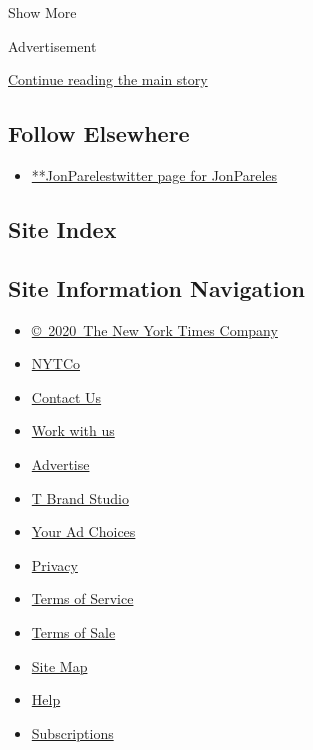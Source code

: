 Show More

Advertisement

\protect\hyperlink{after-mid2}{Continue reading the main story}

\hypertarget{follow-elsewhere}{%
\subsection{Follow Elsewhere}\label{follow-elsewhere}}

\begin{itemize}
\tightlist
\item
  \href{https://twitter.com/JonPareles}{**JonParelestwitter page for
  JonPareles}
\end{itemize}

\hypertarget{site-index}{%
\subsection{Site Index}\label{site-index}}

\hypertarget{site-information-navigation}{%
\subsection{Site Information
Navigation}\label{site-information-navigation}}

\begin{itemize}
\tightlist
\item
  \href{https://help.nytimes.com/hc/en-us/articles/115014792127-Copyright-notice}{©~2020~The
  New York Times Company}
\end{itemize}

\begin{itemize}
\tightlist
\item
  \href{https://www.nytco.com/}{NYTCo}
\item
  \href{https://help.nytimes.com/hc/en-us/articles/115015385887-Contact-Us}{Contact
  Us}
\item
  \href{https://www.nytco.com/careers/}{Work with us}
\item
  \href{https://nytmediakit.com/}{Advertise}
\item
  \href{http://www.tbrandstudio.com/}{T Brand Studio}
\item
  \href{https://www.nytimes.com/privacy/cookie-policy\#how-do-i-manage-trackers}{Your
  Ad Choices}
\item
  \href{https://www.nytimes.com/privacy}{Privacy}
\item
  \href{https://help.nytimes.com/hc/en-us/articles/115014893428-Terms-of-service}{Terms
  of Service}
\item
  \href{https://help.nytimes.com/hc/en-us/articles/115014893968-Terms-of-sale}{Terms
  of Sale}
\item
  \href{https://spiderbites.nytimes.com}{Site Map}
\item
  \href{https://help.nytimes.com/hc/en-us}{Help}
\item
  \href{https://www.nytimes.com/subscription?campaignId=37WXW}{Subscriptions}
\end{itemize}

